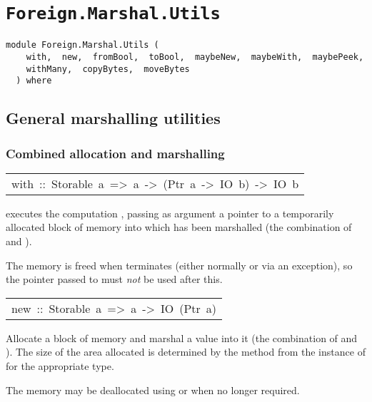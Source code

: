 \chapter{\texttt{Foreign.Marshal.Utils}}
\label{module:Foreign.Marshal.Utils}
\haddockbeginheader
{\haddockverb\begin{verbatim}
module Foreign.Marshal.Utils (
    with,  new,  fromBool,  toBool,  maybeNew,  maybeWith,  maybePeek, 
    withMany,  copyBytes,  moveBytes
  ) where\end{verbatim}}
\haddockendheader

\section{General marshalling utilities
}
\subsection{Combined allocation and marshalling
}
\begin{haddockdesc}
\item[\begin{tabular}{@{}l}
with\ ::\ Storable\ a\ =>\ a\ ->\ (Ptr\ a\ ->\ IO\ b)\ ->\ IO\ b
\end{tabular}]\haddockbegindoc
{} executes the computation , passing as argument
 a pointer to a temporarily allocated block of memory into which
  has been marshalled (the combination of  and ).
\par
The memory is freed when  terminates (either normally or via an
 exception), so the pointer passed to  must \emph{not} be used after this.
\par

\end{haddockdesc}
\begin{haddockdesc}
\item[\begin{tabular}{@{}l}
new\ ::\ Storable\ a\ =>\ a\ ->\ IO\ (Ptr\ a)
\end{tabular}]\haddockbegindoc
Allocate a block of memory and marshal a value into it
 (the combination of  and ).
 The size of the area allocated is determined by the 
 method from the instance of  for the appropriate type.
\par
The memory may be deallocated using  or
  when no longer required.
\par

\end{haddockdesc}

